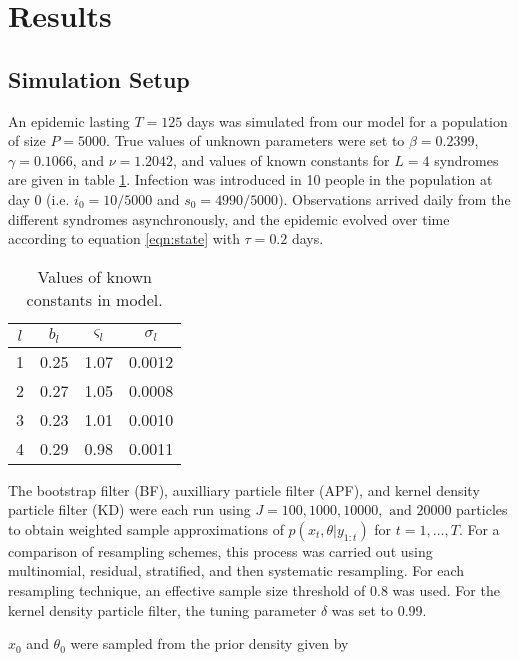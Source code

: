 \documentclass{elsarticle}
\begin{document}
\section{Results}

\subsection{Simulation Setup} \label{sec:sim}

An epidemic lasting $T = 125$ days was simulated from our model for a population of size $P = 5000$.  True values of unknown parameters were set to $\beta = 0.2399$, $\gamma = 0.1066$, and $\nu = 1.2042$, and values of known constants for $L = 4$ syndromes are given in table \ref{tab:true}.  Infection was introduced in 10 people in the population at day 0 (i.e. $i_0 = 10/5000$ and $s_0 = 4990/5000$).  Observations arrived daily from the different syndromes asynchronously, and the epidemic evolved over time according to equation \eqref{eqn:state} with $\tau = 0.2$ days.

\begin{table}[ht]
\begin{center}
\caption{Values of known constants in model.}
\label{tab:true}
\begin{tabular}{|cccc|}
\hline
$l$ & $b_l$ & $\varsigma_l$ & $\sigma_l$ \\
\hline
1 & 0.25 & 1.07 & 0.0012 \\
2 & 0.27 & 1.05 & 0.0008 \\
3 & 0.23 & 1.01 & 0.0010 \\
4 & 0.29 & 0.98 & 0.0011 \\
\hline
\end{tabular}
\end{center}
\end{table}

The bootstrap filter (BF), auxilliary particle filter (APF), and kernel density particle filter (KD) were each run using $J = 100, 1000, 10000, \mbox{ and } 20000$ particles to obtain weighted sample approximations of $p(x_t,\theta|y_{1:t})$ for $t = 1,\ldots,T$.  For a comparison of resampling schemes, this process was carried out using multinomial, residual, stratified, and then systematic resampling.  For each resampling technique, an effective sample size threshold of 0.8 was used.  For the kernel density particle filter, the tuning parameter $\delta$ was set to 0.99.

$x_0$ and $\theta_0$ were sampled from the prior density given by
\end{document}
